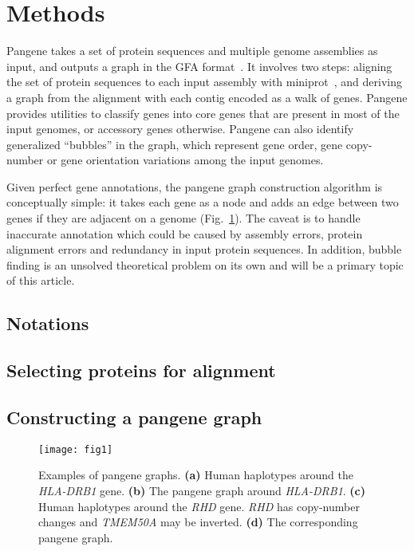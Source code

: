 \documentclass[webpdf,contemporary,large,namedate]{oup-authoring-template}%
\begin{document}
\section{Methods}

Pangene takes a set of protein sequences and multiple genome assemblies as input,
and outputs a graph in the GFA format~\citep{Li:2020aa}.
It involves two steps: aligning the set of protein sequences to each input assembly with miniprot~\citep{Li:2023ac},
and deriving a graph from the alignment with each contig encoded as a walk of genes.
Pangene provides utilities to classify genes into core genes that are present in most of the input genomes, or accessory genes otherwise.
Pangene can also identify generalized ``bubbles'' in the graph, which represent gene order,
gene copy-number or gene orientation variations among the input genomes.

Given perfect gene annotations, the pangene graph construction algorithm is conceptually simple:
it takes each gene as a node and adds an edge between two genes if they are adjacent on a genome (Fig.~\ref{fig:ex1}).
The caveat is to handle inaccurate annotation which could be caused by assembly errors,
protein alignment errors and redundancy in input protein sequences.
In addition, bubble finding is an unsolved theoretical problem on its own
and will be a primary topic of this article.

\subsection{Notations}

\subsection{Selecting proteins for alignment}

\subsection{Constructing a pangene graph}

\begin{figure}[bt!]
\centering
\texttt{[image: fig1]}
\caption{Examples of pangene graphs. {\bf (a)} Human haplotypes around the
\emph{HLA-DRB1} gene. {\bf (b)} The pangene graph around \emph{HLA-DRB1}. {\bf
(c)} Human haplotypes around the \emph{RHD} gene. \emph{RHD} has copy-number
changes and \emph{TMEM50A} may be inverted. {\bf (d)} The corresponding pangene
graph.}\label{fig:ex1}
\end{figure}
\end{document}
